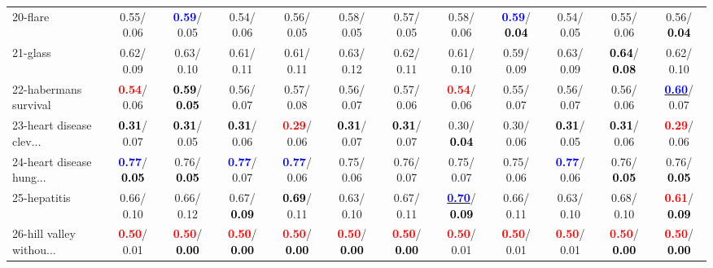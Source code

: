 \begin{table}[h]
\begin{center}
{\begin{tabular}{lc|c|c|c|c|c|c|c|c|c|c}
20-flare &   0.55/  0.06 & \textcolor{blue}{\textbf{  0.59}}/  0.05 &   0.54/  0.06 &   0.56/  0.05 &   0.58/  0.05 &   0.57/  0.05 &   0.58/  0.06 & \textcolor{blue}{\textbf{  0.59}}/\textcolor{black}{\textbf{  0.04}} &   0.54/  0.05 &   0.55/  0.06 &   0.56/\textcolor{black}{\textbf{  0.04}} \\
21-glass &   0.62/  0.09 &   0.63/  0.10 &   0.61/  0.11 &   0.61/  0.11 &   0.63/  0.12 &   0.62/  0.11 &   0.61/  0.10 &   0.59/  0.09 &   0.63/  0.09 & \textcolor{black}{\textbf{  0.64}}/\textcolor{black}{\textbf{  0.08}} &   0.62/  0.10 \\ \hline
22-habermans survival & \textcolor{red}{\textbf{  0.54}}/  0.06 & \textcolor{black}{\textbf{  0.59}}/\textcolor{black}{\textbf{  0.05}} &   0.56/  0.07 &   0.57/  0.08 &   0.56/  0.07 &   0.57/  0.06 & \textcolor{red}{\textbf{  0.54}}/  0.06 &   0.55/  0.07 &   0.56/  0.07 &   0.56/  0.06 & \underline{\textcolor{blue}{\textbf{  0.60}}}/  0.07 \\
23-heart disease clev... & \textcolor{black}{\textbf{  0.31}}/  0.07 & \textcolor{black}{\textbf{  0.31}}/  0.05 & \textcolor{black}{\textbf{  0.31}}/  0.06 & \textcolor{red}{\textbf{  0.29}}/  0.06 & \textcolor{black}{\textbf{  0.31}}/  0.07 & \textcolor{black}{\textbf{  0.31}}/  0.07 &   0.30/\textcolor{black}{\textbf{  0.04}} &   0.30/  0.06 & \textcolor{black}{\textbf{  0.31}}/  0.05 & \textcolor{black}{\textbf{  0.31}}/  0.06 & \textcolor{red}{\textbf{  0.29}}/  0.06 \\
24-heart disease hung... & \textcolor{blue}{\textbf{  0.77}}/\textcolor{black}{\textbf{  0.05}} &   0.76/\textcolor{black}{\textbf{  0.05}} & \textcolor{blue}{\textbf{  0.77}}/  0.07 & \textcolor{blue}{\textbf{  0.77}}/  0.06 &   0.75/  0.06 &   0.76/  0.07 &   0.75/  0.07 &   0.75/  0.06 & \textcolor{blue}{\textbf{  0.77}}/  0.06 &   0.76/\textcolor{black}{\textbf{  0.05}} &   0.76/\textcolor{black}{\textbf{  0.05}} \\
25-hepatitis &   0.66/  0.10 &   0.66/  0.12 &   0.67/\textcolor{black}{\textbf{  0.09}} & \textcolor{black}{\textbf{  0.69}}/  0.11 &   0.63/  0.10 &   0.67/  0.11 & \underline{\textcolor{blue}{\textbf{  0.70}}}/\textcolor{black}{\textbf{  0.09}} &   0.66/  0.11 &   0.63/  0.10 &   0.68/  0.10 & \textcolor{red}{\textbf{  0.61}}/\textcolor{black}{\textbf{  0.09}} \\
26-hill valley withou... & \textcolor{red}{\textbf{  0.50}}/  0.01 & \textcolor{red}{\textbf{  0.50}}/\textcolor{black}{\textbf{  0.00}} & \textcolor{red}{\textbf{  0.50}}/\textcolor{black}{\textbf{  0.00}} & \textcolor{red}{\textbf{  0.50}}/\textcolor{black}{\textbf{  0.00}} & \textcolor{red}{\textbf{  0.50}}/\textcolor{black}{\textbf{  0.00}} & \textcolor{red}{\textbf{  0.50}}/\textcolor{black}{\textbf{  0.00}} & \textcolor{red}{\textbf{  0.50}}/  0.01 & \textcolor{red}{\textbf{  0.50}}/  0.01 & \textcolor{red}{\textbf{  0.50}}/  0.01 & \textcolor{red}{\textbf{  0.50}}/\textcolor{black}{\textbf{  0.00}} & \textcolor{red}{\textbf{  0.50}}/\textcolor{black}{\textbf{  0.00}} \\

\end{tabular}}
\end{center}
\end{table}
